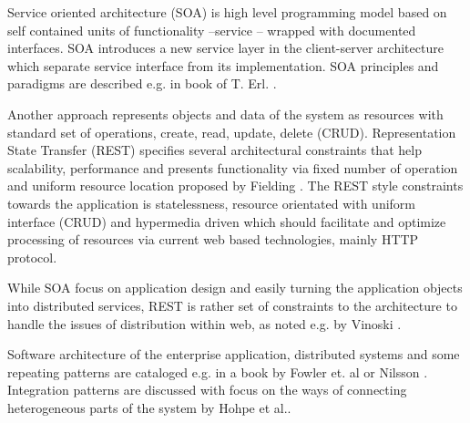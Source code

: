 
Service oriented architecture (SOA) is high level programming model based on self contained units of functionality --service -- wrapped with documented interfaces. SOA introduces a new service layer in the client-server architecture which separate service interface from its implementation. SOA principles and paradigms are described e.g. in book of T. Erl. \cite{Erl2008}. 

Another approach represents objects and data of the system as resources with standard set of operations, create, read, update, delete (CRUD). Representation State Transfer (REST) specifies several architectural constraints that help scalability, performance and presents functionality via fixed number of operation and uniform resource location proposed by Fielding \cite{fielding2000chapter}. The REST style constraints towards the application is statelessness, resource orientated with uniform interface (CRUD) and hypermedia driven which should facilitate and optimize processing of resources via current web based technologies, mainly HTTP protocol. 

While SOA focus on application design and easily turning the application objects into distributed services, REST is rather set of constraints to the architecture to handle the issues of distribution within web, as noted e.g. by Vinoski \cite{Vinoski2007}.

Software architecture of the enterprise application, distributed systems and some repeating patterns are cataloged e.g. in a book by Fowler et. al\cite{Fowler2003} or Nilsson \cite{Nilsson2006}. Integration patterns are discussed with focus on the ways of connecting heterogeneous parts of the system by Hohpe et al.\cite{Hohpe2002}.
